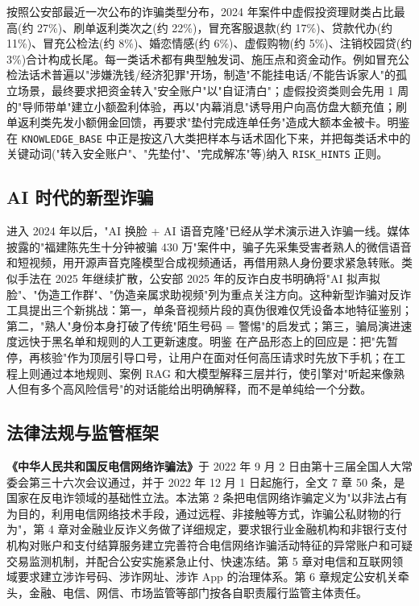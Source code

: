 \documentclass[UTF8,a4paper,12pt]{ctexart}
\begin{document}
按照公安部最近一次公布的诈骗类型分布，2024 年案件中虚假投资理财类占比最高(约 27\%)、刷单返利类次之(约 22\%)，冒充客服退款(约 17\%)、贷款代办(约 11\%)、冒充公检法(约 8\%)、婚恋情感(约 6\%)、虚假购物(约 5\%)、注销校园贷(约 3\%)合计构成长尾。每一类话术都有典型触发词、施压点和资金动作。例如冒充公检法话术普遍以"涉嫌洗钱/经济犯罪"开场，制造"不能挂电话/不能告诉家人"的孤立场景，最终要求把资金转入"安全账户"以"自证清白"；虚假投资类则会先用 1 周的"导师带单"建立小额盈利体验，再以"内幕消息"诱导用户向高仿盘大额充值；刷单返利类先发小额佣金回馈，再要求"垫付完成连单任务"造成大额本金被卡。明鉴 在 \texttt{KNOWLEDGE\_BASE} 中正是按这八大类把样本与话术固化下来，并把每类话术中的关键动词("转入安全账户"、"先垫付"、"完成解冻"等)纳入 \texttt{RISK\_HINTS} 正则。

\subsection{AI 时代的新型诈骗}

进入 2024 年以后，"AI 换脸 + AI 语音克隆"已经从学术演示进入诈骗一线。媒体披露的"福建陈先生十分钟被骗 430 万"案件中，骗子先采集受害者熟人的微信语音和短视频，用开源声音克隆模型合成视频通话，再借用熟人身份要求紧急转账。类似手法在 2025 年继续扩散，公安部 2025 年的反诈白皮书明确将"AI 拟声拟脸"、"伪造工作群"、"伪造亲属求助视频"列为重点关注方向。这种新型诈骗对反诈工具提出三个新挑战：第一，单条音视频片段的真伪很难仅凭设备本地特征鉴别；第二，"熟人"身份本身打破了传统"陌生号码 = 警惕"的启发式；第三，骗局演进速度远快于黑名单和规则的人工更新速度。明鉴 在产品形态上的回应是：把"先暂停，再核验"作为顶层引导口号，让用户在面对任何高压请求时先放下手机；在工程上则通过本地规则、案例 RAG 和大模型解释三层并行，使引擎对"听起来像熟人但有多个高风险信号"的对话能给出明确解释，而不是单纯给一个分数。

\subsection{法律法规与监管框架}

\textbf{《中华人民共和国反电信网络诈骗法》}于 2022 年 9 月 2 日由第十三届全国人大常委会第三十六次会议通过，并于 2022 年 12 月 1 日起施行，全文 7 章 50 条，是国家在反电诈领域的基础性立法。本法第 2 条把电信网络诈骗定义为"以非法占有为目的，利用电信网络技术手段，通过远程、非接触等方式，诈骗公私财物的行为"，第 4 章对金融业反诈义务做了详细规定，要求银行业金融机构和非银行支付机构对账户和支付结算服务建立完善符合电信网络诈骗活动特征的异常账户和可疑交易监测机制，并配合公安实施紧急止付、快速冻结。第 5 章对电信和互联网领域要求建立涉诈号码、涉诈网址、涉诈 App 的治理体系。第 6 章规定公安机关牵头，金融、电信、网信、市场监管等部门按各自职责履行监管主体责任。
\end{document}

